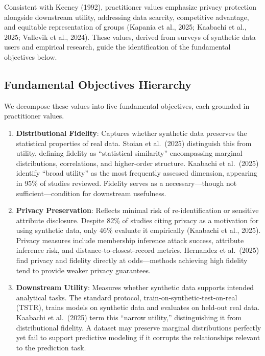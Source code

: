 \documentclass[12pt,a4paper]{article}
\begin{document}
Consistent with Keeney (1992), practitioner values emphasize privacy protection alongside downstream utility, addressing data scarcity, competitive advantage, and equitable representation of groups (Kapania et al., 2025; Kaabachi et al., 2025; Vallevik et al., 2024). These values, derived from surveys of synthetic data users and empirical research, guide the identification of the fundamental objectives below.

\subsection{Fundamental Objectives Hierarchy}

We decompose these values into five fundamental objectives, each grounded in practitioner values.

\begin{enumerate}
    \item \textbf{Distributional Fidelity}: Captures whether synthetic data preserves the statistical properties of real data. Stoian et al.\ (2025) distinguish this from utility, defining fidelity as ``statistical similarity'' encompassing marginal distributions, correlations, and higher-order structure. Kaabachi et al.\ (2025) identify ``broad utility'' as the most frequently assessed dimension, appearing in 95\% of studies reviewed. Fidelity serves as a necessary---though not sufficient---condition for downstream usefulness.
    
    \item \textbf{Privacy Preservation}: Reflects minimal risk of re-identification or sensitive attribute disclosure. Despite 82\% of studies citing privacy as a motivation for using synthetic data, only 46\% evaluate it empirically (Kaabachi et al., 2025). Privacy measures include membership inference attack success, attribute inference risk, and distance-to-closest-record metrics. Hernandez et al.\ (2025) find privacy and fidelity directly at odds---methods achieving high fidelity tend to provide weaker privacy guarantees.
    
    \item \textbf{Downstream Utility}: Measures whether synthetic data supports intended analytical tasks. The standard protocol, train-on-synthetic-test-on-real (TSTR), trains models on synthetic data and evaluates on held-out real data. Kaabachi et al.\ (2025) term this ``narrow utility,'' distinguishing it from distributional fidelity. A dataset may preserve marginal distributions perfectly yet fail to support predictive modeling if it corrupts the relationships relevant to the prediction task.
    

\end{enumerate}
\end{document}
